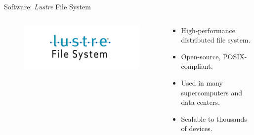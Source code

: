 \begin{frame}{Software: \textit{Lustre} File System}
    \begin{columns}
        \begin{column}{0.4\textwidth}
            \begin{figure}
                \centering
                \includegraphics[width=\textwidth]{images/lustre_logo.png}
            \end{figure}
        \end{column}
        \begin{column}{0.6\textwidth}
            \begin{itemize}
                \item High-performance distributed file system.
                \item Open-source, POSIX-compliant.
                \item Used in many supercomputers and data centers.
                \item Scalable to thousands of devices.
            \end{itemize}
        \end{column}
    \end{columns}
\end{frame}

